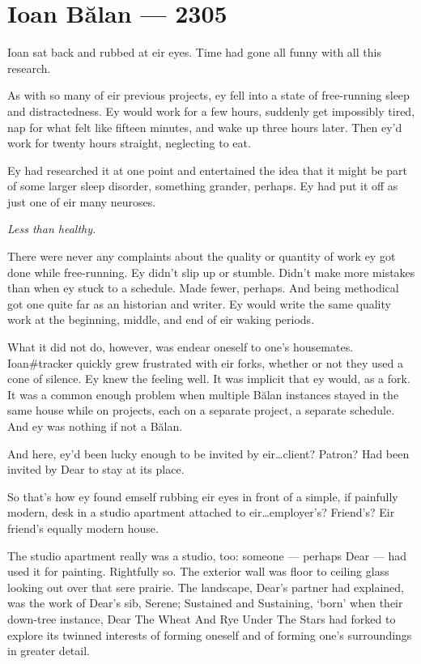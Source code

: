 \hypertarget{ioan-bux103lan-2305}{%
\chapter*{Ioan Bălan — 2305}\label{ioan-bux103lan-2305}}

Ioan sat back and rubbed at eir eyes. Time had gone all funny with all this research.

As with so many of eir previous projects, ey fell into a state of free-running sleep and distractedness. Ey would work for a few hours, suddenly get impossibly tired, nap for what felt like fifteen minutes, and wake up three hours later. Then ey'd work for twenty hours straight, neglecting to eat.

Ey had researched it at one point and entertained the idea that it might be part of some larger sleep disorder, something grander, perhaps. Ey had put it off as just one of eir many neuroses.

\emph{Less than healthy.}

There were never any complaints about the quality or quantity of work ey got done while free-running. Ey didn't slip up or stumble. Didn't make more mistakes than when ey stuck to a schedule. Made fewer, perhaps. And being methodical got one quite far as an historian and writer. Ey would write the same quality work at the beginning, middle, and end of eir waking periods.

What it did not do, however, was endear oneself to one's housemates. Ioan\#tracker quickly grew frustrated with eir forks, whether or not they used a cone of silence. Ey knew the feeling well. It was implicit that ey would, as a fork. It was a common enough problem when multiple Bălan instances stayed in the same house while on projects, each on a separate project, a separate schedule. And ey was nothing if not a Bălan.

And here, ey'd been lucky enough to be invited by eir\ldots{}client? Patron? Had been invited by Dear to stay at its place.

So that's how ey found emself rubbing eir eyes in front of a simple, if painfully modern, desk in a studio apartment attached to eir\ldots{}employer's? Friend's? Eir friend's equally modern house.

The studio apartment really was a studio, too: someone — perhaps Dear — had used it for painting. Rightfully so. The exterior wall was floor to ceiling glass looking out over that sere prairie. The landscape, Dear's partner had explained, was the work of Dear's sib, Serene; Sustained and Sustaining, `born' when their down-tree instance, Dear The Wheat And Rye Under The Stars had forked to explore its twinned interests of forming oneself and of forming one's surroundings in greater detail.

